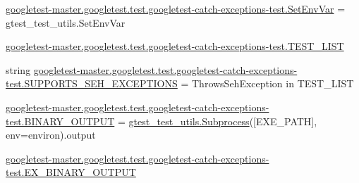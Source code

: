\begin{DoxyCompactItemize}
\item 
\mbox{\hyperlink{namespacegoogletest-master_1_1googletest_1_1test_1_1googletest-catch-exceptions-test_a628cc8e0e9b1e854a3d63f8661768c05}{googletest-\/master.\+googletest.\+test.\+googletest-\/catch-\/exceptions-\/test.\+Set\+Env\+Var}} = gtest\+\_\+test\+\_\+utils.\+Set\+Env\+Var
\item 
\mbox{\hyperlink{namespacegoogletest-master_1_1googletest_1_1test_1_1googletest-catch-exceptions-test_a49a7e74a99e57462323d2cb6d7d37892}{googletest-\/master.\+googletest.\+test.\+googletest-\/catch-\/exceptions-\/test.\+T\+E\+S\+T\+\_\+\+L\+I\+ST}}
\item 
string \mbox{\hyperlink{namespacegoogletest-master_1_1googletest_1_1test_1_1googletest-catch-exceptions-test_ad92833ca39b519f5c0d0495ce0297436}{googletest-\/master.\+googletest.\+test.\+googletest-\/catch-\/exceptions-\/test.\+S\+U\+P\+P\+O\+R\+T\+S\+\_\+\+S\+E\+H\+\_\+\+E\+X\+C\+E\+P\+T\+I\+O\+NS}} = \textquotesingle{}Throws\+Seh\+Exception\textquotesingle{} in T\+E\+S\+T\+\_\+\+L\+I\+ST
\item 
\mbox{\hyperlink{namespacegoogletest-master_1_1googletest_1_1test_1_1googletest-catch-exceptions-test_a76e71b435194026fe9388ab0f1c6e49e}{googletest-\/master.\+googletest.\+test.\+googletest-\/catch-\/exceptions-\/test.\+B\+I\+N\+A\+R\+Y\+\_\+\+O\+U\+T\+P\+UT}} = \mbox{\hyperlink{classgtest__test__utils_1_1_subprocess}{gtest\+\_\+test\+\_\+utils.\+Subprocess}}(\mbox{[}E\+X\+E\+\_\+\+P\+A\+TH\mbox{]}, env=environ).output
\item 
\mbox{\hyperlink{namespacegoogletest-master_1_1googletest_1_1test_1_1googletest-catch-exceptions-test_a519ef513dfd64df84010a609a488f2c4}{googletest-\/master.\+googletest.\+test.\+googletest-\/catch-\/exceptions-\/test.\+E\+X\+\_\+\+B\+I\+N\+A\+R\+Y\+\_\+\+O\+U\+T\+P\+UT}}
\end{DoxyCompactItemize}
